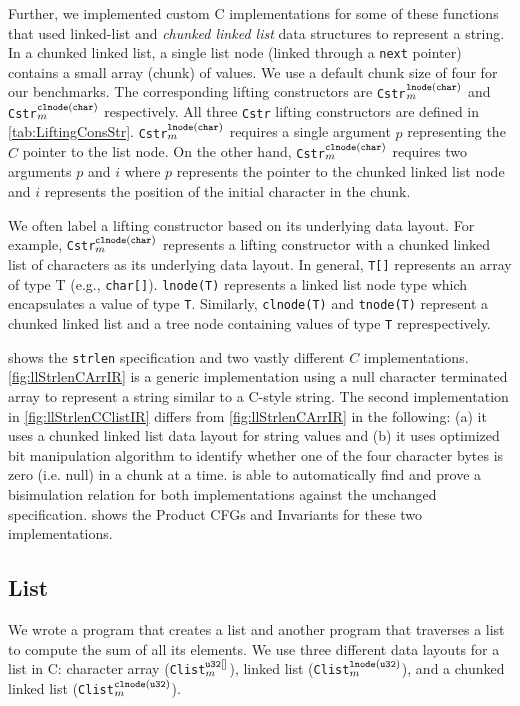 Further, we implemented
custom C implementations for some of these functions that used
linked-list
and {\em chunked linked list} data structures
to represent a string.
In a chunked linked list, a single list node (linked
through a {\tt next} pointer)
contains a small array (chunk) of values.
We use a default chunk size of four for our
benchmarks.
The corresponding lifting constructors are {\tt Cstr}$^{\tt lnode(char)}_m$
and {\tt Cstr}$^{\tt clnode(char)}_m$ respectively.
All three {\tt Cstr} lifting constructors are defined in \cref{tab:LiftingConsStr}.
{\tt Cstr}$^{\tt lnode(char)}_m$ requires a single
argument $p$ representing the $C$ pointer to the list node.
On the other hand, {\tt Cstr}$^{\tt clnode(char)}_m$ requires two arguments $p$
and $i$ where $p$ represents the pointer to the chunked linked list node
and $i$ represents the position of the initial character in the chunk.

We often label a lifting constructor based on its underlying data layout.
For example, {\tt Cstr}$^{\tt clnode(char)}_m$ represents a lifting constructor
with a chunked linked list of characters as its underlying data layout.
In general, {\tt T[]} represents an array of type T (e.g., {\tt char[]}).
{\tt lnode(T)} represents a  linked list node type which encapsulates a value of type {\tt T}.
Similarly, {\tt clnode(T)} and {\tt tnode(T)} represent a chunked linked list and a tree node
containing values of type {\tt T} represpectively.



 shows the {\tt strlen} specification and two vastly
different $C$ implementations. \cref{fig:llStrlenCArrIR} is a generic implementation
using a null character terminated array to represent a string similar to a C-style string.
The second implementation in \cref{fig:llStrlenCClistIR} differs from \cref{fig:llStrlenCArrIR}
in the following: (a) it uses a chunked linked list data layout for string values
and (b) it uses optimized bit manipulation algorithm to identify whether one of the four
character bytes is zero (i.e. null) in a chunk at a time. \toolName{} is able to automatically
find and prove a bisimulation relation for both implementations against the unchanged specification.
 shows the Product CFGs and Invariants for these two implementations.



\subsection{List} We wrote a \SpecL{} program that creates a list and another \SpecL{}
program that traverses a list to compute the sum of all its elements. We use three different
data layouts for a list in C: character array ({\tt Clist}$_m^{\tt u32[]}$),
linked list ({\tt Clist}$_m^{\tt lnode(u32)}$), and
a chunked linked list ({\tt Clist}$_m^{\tt clnode(u32)}$).
\\ \\
